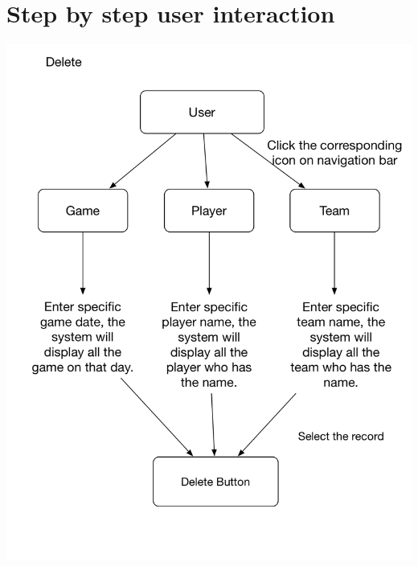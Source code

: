 \documentclass[a4paper,12pt]{article} %
\begin{document}
\section{Step by step user interaction}
\begin{center}
\includegraphics[width=1\textwidth]{DeleteChart}
\end{center}
\end{document}
